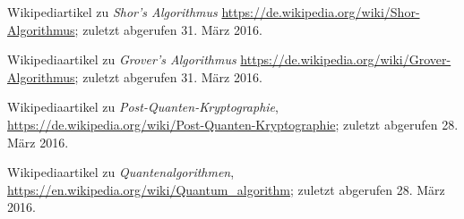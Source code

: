 \begin{thebibliography}{9}
    Wikipediartikel zu \emph{Shor's Algorithmus}
    \url{https://de.wikipedia.org/wiki/Shor-Algorithmus};
    zuletzt abgerufen 31. März 2016.

    Wikipediaartikel zu \emph{Grover's Algorithmus}
    \url{https://de.wikipedia.org/wiki/Grover-Algorithmus};
    zuletzt abgerufen 31. März 2016.

    Wikipediaartikel zu \emph{Post-Quanten-Kryptographie},
    \url{https://de.wikipedia.org/wiki/Post-Quanten-Kryptographie};
    zuletzt abgerufen 28. März 2016.

    Wikipediaartikel zu \emph{Quantenalgorithmen},
    \url{https://en.wikipedia.org/wiki/Quantum_algorithm};
    zuletzt abgerufen 28. März 2016.

\end{thebibliography}
